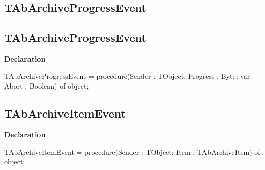 \documentclass{report}
\newif\ifpdf
\begin{document}
\subsection*{\large{\textbf{TAbArchiveProgressEvent}}\normalsize\hspace{1ex}\hrulefill}
\else
\subsection*{TAbArchiveProgressEvent}
\fi
\label{AbArcTyp-TAbArchiveProgressEvent}
\begin{list}{}{
\setlength{\itemindent}{0cm}
\setlength{\listparindent}{0cm}
\setlength{\leftmargin}{\evensidemargin}
\addtolength{\leftmargin}{\tmplength}
\settowidth{\labelsep}{X}
\addtolength{\leftmargin}{\labelsep}
\setlength{\labelwidth}{\tmplength}
}
\item[\textbf{Declaration}\hfill]
\ifpdf
\begin{flushleft}
\fi
\begin{ttfamily}
TAbArchiveProgressEvent = procedure(Sender : TObject; Progress : Byte; var Abort : Boolean) of object;\end{ttfamily}

\ifpdf
\end{flushleft}
\fi

\end{list}
\ifpdf
\subsection*{\large{\textbf{TAbArchiveItemEvent}}\normalsize\hspace{1ex}\hrulefill}
\else
\subsection*{TAbArchiveItemEvent}
\fi
\label{AbArcTyp-TAbArchiveItemEvent}
\begin{list}{}{
\setlength{\itemindent}{0cm}
\setlength{\listparindent}{0cm}
\setlength{\leftmargin}{\evensidemargin}
\addtolength{\leftmargin}{\tmplength}
\settowidth{\labelsep}{X}
\addtolength{\leftmargin}{\labelsep}
\setlength{\labelwidth}{\tmplength}
}
\item[\textbf{Declaration}\hfill]
\ifpdf
\begin{flushleft}
\fi
\begin{ttfamily}
TAbArchiveItemEvent = procedure(Sender : TObject; Item : TAbArchiveItem) of object;\end{ttfamily}

\ifpdf
\end{flushleft}
\fi

\end{list}
\ifpdf
\end{document}
